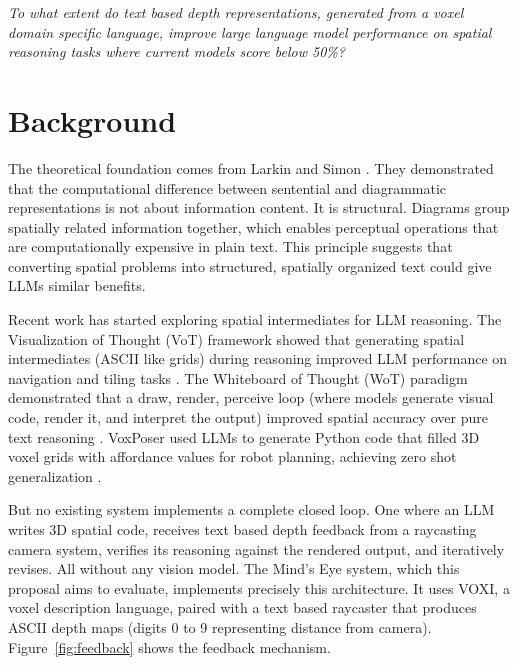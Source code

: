 \documentclass[stu,12pt,a4paper,floatsintext]{apa7}
\begin{document}
\begin{center}
\emph{To what extent do text based depth representations, generated from a voxel domain specific language, improve large language model performance on spatial reasoning tasks where current models score below 50\%?}
\end{center}

\section*{Background}

The theoretical foundation comes from Larkin and Simon \cite{larkin1987}. They demonstrated that the computational difference between sentential and diagrammatic representations is not about information content. It is structural. Diagrams group spatially related information together, which enables perceptual operations that are computationally expensive in plain text. This principle suggests that converting spatial problems into structured, spatially organized text could give LLMs similar benefits.

Recent work has started exploring spatial intermediates for LLM reasoning. The Visualization of Thought (VoT) framework showed that generating spatial intermediates (ASCII like grids) during reasoning improved LLM performance on navigation and tiling tasks \cite{wu2024}. The Whiteboard of Thought (WoT) paradigm demonstrated that a draw, render, perceive loop (where models generate visual code, render it, and interpret the output) improved spatial accuracy over pure text reasoning \cite{menon2024}. VoxPoser used LLMs to generate Python code that filled 3D voxel grids with affordance values for robot planning, achieving zero shot generalization \cite{huang2023}.

But no existing system implements a complete closed loop. One where an LLM writes 3D spatial code, receives text based depth feedback from a raycasting camera system, verifies its reasoning against the rendered output, and iteratively revises. All without any vision model. The Mind's Eye system, which this proposal aims to evaluate, implements precisely this architecture. It uses VOXI, a voxel description language, paired with a text based raycaster that produces ASCII depth maps (digits 0 to 9 representing distance from camera). Figure~\ref{fig:feedback} shows the feedback mechanism.
\end{document}
